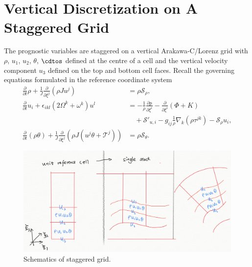 \documentclass{report}
\begin{document}
\chapter{Vertical Discretization on A Staggered Grid}
The prognostic variables are staggered on a vertical Arakawa-C/Lorenz grid with $\rho$, $u_1$, $u_2$, $\theta$, $\cdtos$  defined at the
centre of a cell and the vertical velocity component $u_3$ defined on the top and bottom cell faces. Recall the governing equations formulated in the reference coordinate system
\begin{subequations}
\begin{align}
\frac{\partial}{\partial t}  \rho + \frac{1}{J} \frac{\partial}{\partial \xi^j} \left(\rho J u^j\right)
    & = \rho \mathcal{S}_\rho,
    \label{e:equations_coord_hor_vert:density}\\
    \frac{\partial}{\partial t} u_i + \epsilon_{ikl} (2\Omega^k + \omega^k) u^l 
    &=  -\frac{1}{\rho} \frac{\partial p}{\partial\xi^i} 
   -  \frac{\partial}{\partial \xi^i} (\Phi + K)  \nonumber\\
    & \quad + \mathcal{S}'_{u, i} - g_{ij} \frac{1}{\rho} \nabla_k (\rho \tau^{jk}) - \mathcal{S}_\rho u_i,
    \label{e:equations_coord_hor_vert:velocity}\\
        \frac{\partial}{\partial t}  (\rho \theta) + \frac{1}{J} \frac{\partial}{\partial \xi^j} \left(\rho J (u^j \theta + \mathcal{T}^j)\right)
    & = \rho \mathcal{S}_\theta.
    \label{e:equations_coord_hor_vert:theta}
\end{align}
\end{subequations}



\begin{figure}
    \centering
    \includegraphics[width=0.8 \textwidth]{CLIMA-numerics/figures/staggered/StaggeredGrid.png}
    \caption{Schematics of staggered grid.}
    \label{fig:staggered-grid}
\end{figure}
\end{document}
